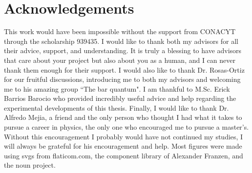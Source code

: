\documentclass[12pt]{book}
\begin{document}

\chapter*{Acknowledgements}
\thispagestyle{plain}

This work would have been impossible without the support from CONACYT through the scholarship 939435. I would like to thank both my advisors for all their advice, support, and understanding. It is truly a blessing to have advisors that care about your project but also about you as a human, and I can never thank them enough for their support. I would also like to thank Dr. Rosas-Ortiz for our fruitful discussions, introducing me to both my advisors and welcoming me to his amazing group ``The bar quantum". I am thankful to M.Sc. Erick Barrios Barocio who provided incredibly useful advice and help regarding the experimental developments of this thesis. Finally, I would like to thank Dr. Alfredo Mejia, a friend and the only person who thought I had what it takes to pursue a career in physics, the only one who encouraged me to pursue a master's. Without this encouragement I probably would have not continued my studies, I will always be grateful for his encouragement and help. Most figures were made using svgs from flaticom.com, the component library of Alexander Franzen, and the noun project.
\end{document}
